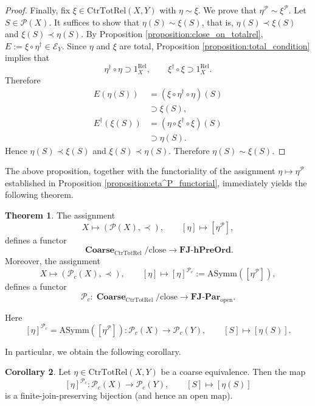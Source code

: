 \documentclass[12pt, a4paper]{amsart}
\theoremstyle{definition}
\newtheorem{theorem}{Theorem}[section]
\newtheorem{corollary}[theorem]{Corollary}
\newcommand{\open}{\mathop{\mathrm{open}}\nolimits}
\newcommand{\Coarse}{\mathop{\mathbf{Coarse}}\nolimits}
\newcommand{\Rel}{\mathrm{Rel}}
\newcommand{\CtrTotRel}{\mathrm{CtrTotRel}}
\newcommand{\close}{\mathrm{close}}
\newcommand{\AS}{\mathrm{ASymm}}
\newcommand{\FinJoinParOrd}{\mathbf{FJ}\text{-}\mathbf{Par}}
\newcommand{\hFinJoinPreOrd}{\mathbf{FJ}\text{-}\mathbf{hPreOrd}}
\begin{document}
\begin{proof}
Finally, fix
$\xi\in\CtrTotRel(X,Y)$
with
$\eta\sim\xi$.
We prove that
$\eta^{\mathcal{P}}\sim\xi^{\mathcal{P}}$.
Let
$S\in\mathcal{P}(X)$.
It suffices to show that
$\eta(S)\sim\xi(S)$,
that is,
$\eta(S)\prec\xi(S)$
and
$\xi(S)\prec\eta(S)$.
By Proposition \ref{proposition:close_on_totalrel},
$E:=\xi\circ\eta^\dagger
\in
\mathcal E_Y$.
Since
$\eta$
and
$\xi$
are total,
Proposition \ref{proposition:total_condition}
implies that
\[
\eta^\dagger\circ\eta\supset1_X^{\Rel},
\qquad
\xi^\dagger\circ\xi\supset1_X^{\Rel}.
\]
Therefore
\begin{align*}
E(\eta(S))
    &= (\xi\circ\eta^\dagger\circ\eta)(S) \\
    &\supset \xi(S), \\
E^\dagger(\xi(S))
    &= (\eta\circ\xi^\dagger\circ\xi)(S) \\
    &\supset \eta(S).
\end{align*}
Hence
$\eta(S)\prec\xi(S)$
and
$\xi(S)\prec\eta(S)$.
Therefore
$\eta(S)\sim\xi(S)$.
\end{proof}

The above proposition, together with the functoriality of the assignment
$\eta\mapsto\eta^{\mathcal{P}}$
established in Proposition \ref{proposition:eta^P_functorial},
immediately yields the following theorem.

\begin{theorem}\label{theorem:etaPc}
The assignment
\[
X\mapsto(\mathcal{P}(X),\prec),
\qquad
[\eta]\mapsto[\eta^{\mathcal{P}}],
\]
defines a functor
\[
\Coarse_{\CtrTotRel}/\close
\longrightarrow
\hFinJoinPreOrd.
\]
Moreover, the assignment
\[
X\mapsto(\mathcal{P}_c(X),\prec),
\qquad
[\eta]\mapsto
[\eta]^{\mathcal{P}_c}
:=
\AS([\eta^{\mathcal{P}}]),
\]
defines a functor
\[
\mathcal{P}_c : 
\Coarse_{\CtrTotRel}/\close
\longrightarrow
\FinJoinParOrd_{\open}.
\]

Here
\[
[\eta]^{\mathcal{P}_c}
=
\AS([\eta^{\mathcal{P}}]):
\mathcal{P}_c(X)
\longrightarrow
\mathcal{P}_c(Y),
\qquad
[S]\longmapsto[\eta(S)].
\]
\end{theorem}

In particular, we obtain the following corollary.

\begin{corollary}\label{corollary:CE_Pcbij}
Let $\eta\in\CtrTotRel(X,Y)$ be a coarse equivalence. Then the map
\[
[\eta]^{\mathcal{P}_c}:
\mathcal{P}_c(X)
\longrightarrow
\mathcal{P}_c(Y),
\qquad
[S]\longmapsto[\eta(S)]
\]
is a finite-join-preserving bijection (and hence an open map).
\end{corollary}
\end{document}

